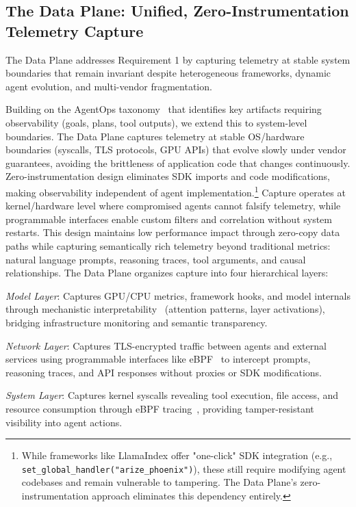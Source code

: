 \documentclass[sigplan,screen,9pt]{acmart}
\begin{document}
\subsection{The Data Plane: Unified, Zero-Instrumentation Telemetry Capture}

The Data Plane addresses Requirement 1 by capturing telemetry at stable system boundaries that remain invariant despite heterogeneous frameworks, dynamic agent evolution, and multi-vendor fragmentation.

Building on the AgentOps taxonomy~\cite{Dong2024AgentOps} that identifies key artifacts requiring observability (goals, plans, tool outputs), we extend this to system-level boundaries. The Data Plane captures telemetry at stable OS/hardware boundaries (syscalls, TLS protocols, GPU APIs) that evolve slowly under vendor guarantees, avoiding the brittleness of application code that changes continuously. Zero-instrumentation design eliminates SDK imports and code modifications, making observability independent of agent implementation.\footnote{While frameworks like LlamaIndex offer "one-click" SDK integration (e.g., \texttt{set\_global\_handler("arize\_phoenix")}), these still require modifying agent codebases and remain vulnerable to tampering. The Data Plane's zero-instrumentation approach eliminates this dependency entirely.} Capture operates at kernel/hardware level where compromised agents cannot falsify telemetry, while programmable interfaces enable custom filters and correlation without system restarts. This design maintains low performance impact through zero-copy data paths while capturing semantically rich telemetry beyond traditional metrics: natural language prompts, reasoning traces, tool arguments, and causal relationships. The Data Plane organizes capture into four hierarchical layers:

\emph{Model Layer}: Captures GPU/CPU metrics, framework hooks, and model internals through mechanistic interpretability~\cite{Kim2025AgenticInterp} (attention patterns, layer activations), bridging infrastructure monitoring and semantic transparency.

\emph{Network Layer}: Captures TLS-encrypted traffic between agents and external services using programmable interfaces like eBPF~\cite{zheng2025extending} to intercept prompts, reasoning traces, and API responses without proxies or SDK modifications.

\emph{System Layer}: Captures kernel syscalls revealing tool execution, file access, and resource consumption through eBPF tracing~\cite{brendangregg,ebpfio}, providing tamper-resistant visibility into agent actions.
\end{document}
